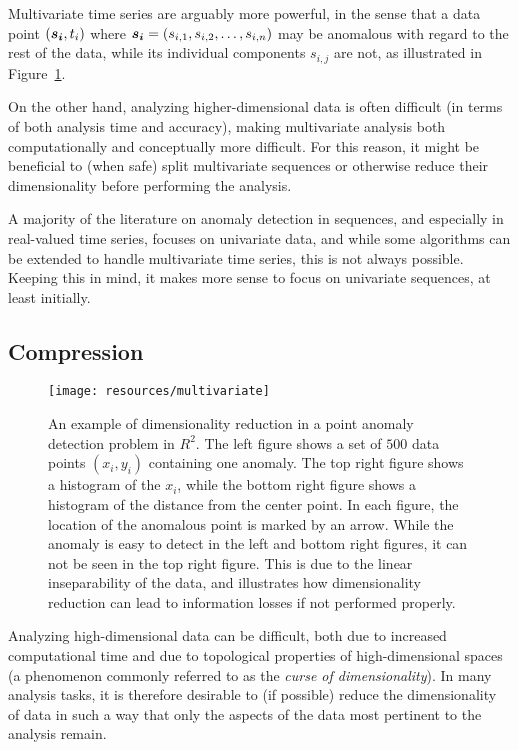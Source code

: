 Multivariate time series are arguably more powerful, in the sense that a data point $(\boldsymbol{s_i}, t_i)$ where $\boldsymbol{s_i} = (s_{i,1}, s_{i,2}, \dots, s_{i,n})$ may be anomalous with regard to the rest of the data, while its individual components $s_{i,j}$ are not, as illustrated in Figure~\ref{fig:dimensionality_reduction}.

On the other hand, analyzing higher-dimensional data is often difficult (in terms of both analysis time and accuracy), making multivariate analysis both computationally and conceptually more difficult. For this reason, it might be beneficial to (when safe) split multivariate sequences or otherwise reduce their dimensionality before performing the analysis.

A majority of the literature on anomaly detection in sequences, and especially in real-valued time series, focuses on univariate data, and while some algorithms can be extended to handle multivariate time series, this is not always possible. Keeping this in mind, it makes more sense to focus on univariate sequences, at least initially.

\subsection{Compression}
\label{sect:compression}

\begin{figure}[htb]
\begin{center}
\leavevmode
\texttt{[image: resources/multivariate]}
\end{center}
\caption{\small{An example of dimensionality reduction in a point anomaly detection problem in $R^2$. The left figure shows a set of $500$ data points $(x_i, y_i)$ containing one anomaly. The top right figure shows a histogram of the $x_i$, while the bottom right figure shows a histogram of the distance from the center point. In each figure, the location of the anomalous point is marked by an arrow. While the anomaly is easy to detect in the left and bottom right figures, it can not be seen in the top right figure. This is due to the linear inseparability of the data, and illustrates how dimensionality reduction can lead to information losses if not performed properly.}}
\label{fig:dimensionality_reduction}
\end{figure}

Analyzing high-dimensional data can be difficult, both due to increased computational time and due to topological properties of high-dimensional spaces (a phenomenon commonly referred to as the \emph{curse of dimensionality}). In many analysis tasks, it is therefore desirable to (if possible) reduce the dimensionality of data in such a way that only the aspects of the data most pertinent to the analysis remain.

